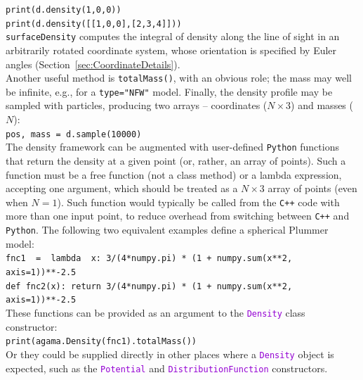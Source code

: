 \documentclass[12pt]{article}
\newcommand{\Cpp}  {\texttt{C++}\xspace}
\newcommand{\Python}{\texttt{Python}\xspace}
\newcommand{\ttt}[1]{\textcolor{darkviolet}{\texttt{#1}}}
\newcommand{\ppp}[1]{\textcolor{darkolive} {\texttt{#1}}}
\begin{document}
\texttt{print(d.density(1,0,0))}\\
\texttt{print(d.density([[1,0,0],[2,3,4]]))}\\[2mm]
\texttt{surfaceDensity} computes the integral of density along the line of sight in an arbitrarily rotated coordinate system, whose orientation is specified by Euler angles (Section~\ref{sec:CoordinateDetails}).\\[2mm]
Another useful method is \texttt{totalMass()}, with an obvious role; the mass may well be infinite, e.g., for a \ppp{type="NFW"} model.
Finally, the density profile may be sampled with particles, producing two arrays -- coordinates ($N\times3$) and masses ($N$): \\
\texttt{pos, mass = d.sample(10000)}\\[2mm]
The density framework can be augmented with user-defined \Python functions that return the density at a given point (or, rather, an array of points). Such a function must be a free function (not a class method) or a lambda expression, accepting one argument, which should be treated as a $N\times3$ array of points (even when $N=1$). Such function would typically be called from the \Cpp code with more than one input point, to reduce overhead from switching between \Cpp and \Python. The following two equivalent examples define a spherical Plummer model:\\
\texttt{fnc1~~=~~lambda~~x:  3/(4*numpy.pi) * (1 + numpy.sum(x**2, axis=1))**-2.5}\\
\texttt{def fnc2(x):  return 3/(4*numpy.pi) * (1 + numpy.sum(x**2, axis=1))**-2.5}\\
These functions can be provided as an argument to the \ttt{Density} class constructor:\\
\texttt{print(agama.Density(fnc1).totalMass())}\\
Or they could be supplied directly in other places where a \ttt{Density} object is expected, such as the \ttt{Potential} and \ttt{DistributionFunction} constructors.
\end{document}
